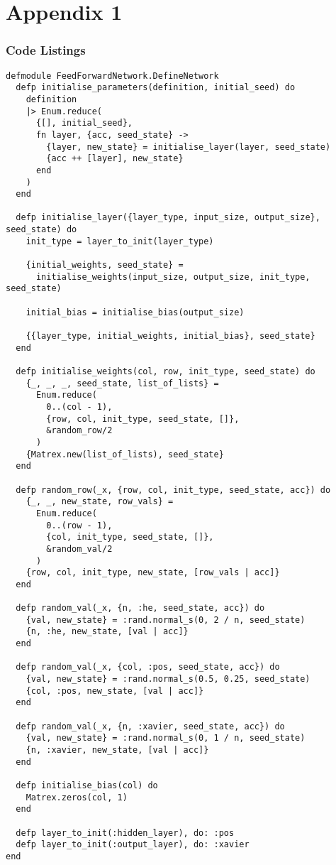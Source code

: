 \section{Appendix 1}
\subsubsection{Code Listings}
\begin{lstlisting}[caption={Network Initialisation}, label={network_initialisation}]
defmodule FeedForwardNetwork.DefineNetwork
  defp initialise_parameters(definition, initial_seed) do
    definition
    |> Enum.reduce(
      {[], initial_seed},
      fn layer, {acc, seed_state} ->
        {layer, new_state} = initialise_layer(layer, seed_state)
        {acc ++ [layer], new_state}
      end
    )
  end

  defp initialise_layer({layer_type, input_size, output_size}, seed_state) do
    init_type = layer_to_init(layer_type)

    {initial_weights, seed_state} =
      initialise_weights(input_size, output_size, init_type, seed_state)

    initial_bias = initialise_bias(output_size)

    {{layer_type, initial_weights, initial_bias}, seed_state}
  end

  defp initialise_weights(col, row, init_type, seed_state) do
    {_, _, _, seed_state, list_of_lists} =
      Enum.reduce(
        0..(col - 1),
        {row, col, init_type, seed_state, []},
        &random_row/2
      )
    {Matrex.new(list_of_lists), seed_state}
  end

  defp random_row(_x, {row, col, init_type, seed_state, acc}) do
    {_, _, new_state, row_vals} =
      Enum.reduce(
        0..(row - 1),
        {col, init_type, seed_state, []},
        &random_val/2
      )
    {row, col, init_type, new_state, [row_vals | acc]}
  end

  defp random_val(_x, {n, :he, seed_state, acc}) do
    {val, new_state} = :rand.normal_s(0, 2 / n, seed_state)
    {n, :he, new_state, [val | acc]}
  end

  defp random_val(_x, {col, :pos, seed_state, acc}) do
    {val, new_state} = :rand.normal_s(0.5, 0.25, seed_state)
    {col, :pos, new_state, [val | acc]}
  end

  defp random_val(_x, {n, :xavier, seed_state, acc}) do
    {val, new_state} = :rand.normal_s(0, 1 / n, seed_state)
    {n, :xavier, new_state, [val | acc]}
  end

  defp initialise_bias(col) do
    Matrex.zeros(col, 1)
  end

  defp layer_to_init(:hidden_layer), do: :pos
  defp layer_to_init(:output_layer), do: :xavier
end
\end{lstlisting}

